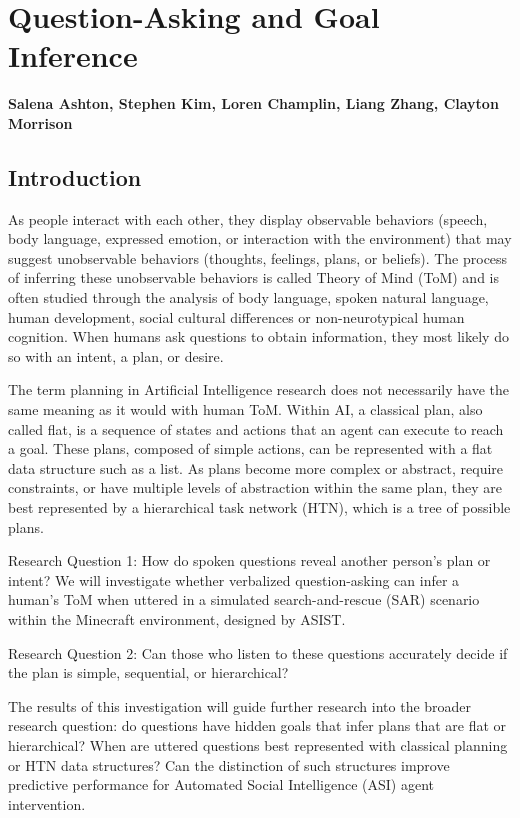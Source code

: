 

\chapter{Question-Asking and Goal Inference}
\label{ch:question_plan}
\textbf{Salena Ashton, Stephen Kim, Loren Champlin, Liang Zhang, Clayton Morrison}

\section{Introduction}

As people interact with each other, they display observable behaviors (speech, body language, expressed emotion, or interaction with the environment) that may suggest unobservable behaviors (thoughts, feelings, plans, or beliefs). The process of inferring these unobservable behaviors is called Theory of Mind (ToM) and is often studied through the analysis of body language, spoken natural language, human development, social cultural differences or non-neurotypical human cognition. When humans ask questions to obtain information, they most likely do so with an intent, a plan, or desire.

The term planning in Artificial Intelligence research does not necessarily have the same meaning as it would with human ToM. Within AI, a classical plan, also called flat, is a sequence of states and actions that an agent can execute to reach a goal. These plans, composed of simple actions, can be represented with a flat data structure such as a list. As plans become more complex or abstract, require constraints, or have multiple levels of abstraction within the same plan, they are best represented by a hierarchical task network (HTN), which is a tree of possible plans.

Research Question 1: How do spoken questions reveal another person’s plan or intent?
We will investigate whether verbalized question-asking can infer a human’s ToM when uttered in a simulated search-and-rescue (SAR) scenario within the Minecraft environment, designed by ASIST.

Research Question 2: Can those who listen to these questions accurately decide if the plan is simple, sequential, or hierarchical?

The results of this investigation will guide further research into the broader research question: do questions have hidden goals that infer plans that are flat or hierarchical? When are uttered questions best represented with classical planning or HTN data structures?  Can the distinction of such structures improve predictive performance for Automated Social Intelligence (ASI) agent intervention.


